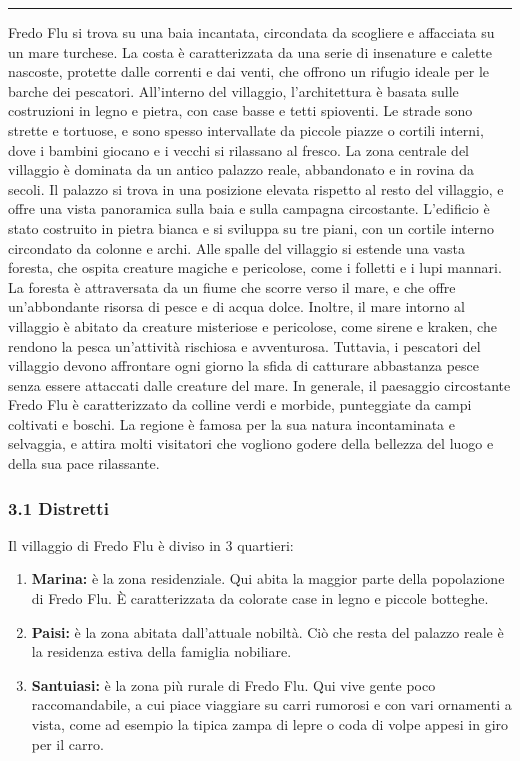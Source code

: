 \begin{center}\rule{0.5\linewidth}{0.5pt}\end{center}

Fredo Flu si trova su una baia incantata, circondata da scogliere e
affacciata su un mare turchese. La costa è caratterizzata da una serie
di insenature e calette nascoste, protette dalle correnti e dai venti,
che offrono un rifugio ideale per le barche dei pescatori. All'interno
del villaggio, l'architettura è basata sulle costruzioni in legno e
pietra, con case basse e tetti spioventi. Le strade sono strette e
tortuose, e sono spesso intervallate da piccole piazze o cortili
interni, dove i bambini giocano e i vecchi si rilassano al fresco. La
zona centrale del villaggio è dominata da un antico palazzo reale,
abbandonato e in rovina da secoli. Il palazzo si trova in una posizione
elevata rispetto al resto del villaggio, e offre una vista panoramica
sulla baia e sulla campagna circostante. L'edificio è stato costruito in
pietra bianca e si sviluppa su tre piani, con un cortile interno
circondato da colonne e archi. Alle spalle del villaggio si estende una
vasta foresta, che ospita creature magiche e pericolose, come i folletti
e i lupi mannari. La foresta è attraversata da un fiume che scorre verso
il mare, e che offre un'abbondante risorsa di pesce e di acqua dolce.
Inoltre, il mare intorno al villaggio è abitato da creature misteriose e
pericolose, come sirene e kraken, che rendono la pesca un'attività
rischiosa e avventurosa. Tuttavia, i pescatori del villaggio devono
affrontare ogni giorno la sfida di catturare abbastanza pesce senza
essere attaccati dalle creature del mare. In generale, il paesaggio
circostante Fredo Flu è caratterizzato da colline verdi e morbide,
punteggiate da campi coltivati e boschi. La regione è famosa per la sua
natura incontaminata e selvaggia, e attira molti visitatori che vogliono
godere della bellezza del luogo e della sua pace rilassante.

\subsubsection{3.1 Distretti}\label{distretti}

Il villaggio di Fredo Flu è diviso in 3 quartieri:

\begin{enumerate}
\def\labelenumi{\arabic{enumi}.}
\tightlist
\item
  \textbf{Marina:} è la zona residenziale. Qui abita la maggior parte
  della popolazione di Fredo Flu. È caratterizzata da colorate case in
  legno e piccole botteghe.
\item
  \textbf{Paisi:} è la zona abitata dall'attuale nobiltà. Ciò che resta
  del palazzo reale è la residenza estiva della famiglia nobiliare.
\item
  \textbf{Santuiasi:} è la zona più rurale di Fredo Flu. Qui vive gente
  poco raccomandabile, a cui piace viaggiare su carri rumorosi e con
  vari ornamenti a vista, come ad esempio la tipica zampa di lepre o
  coda di volpe appesi in giro per il carro.
\end{enumerate}

